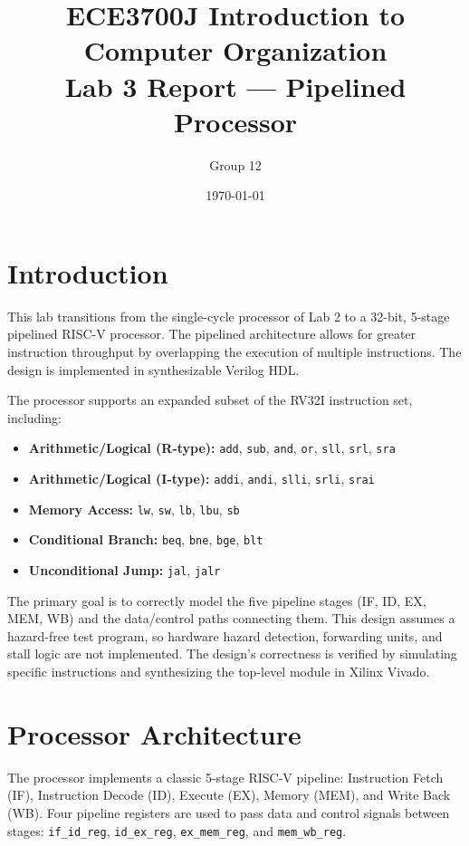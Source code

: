 \documentclass{article}
\title{\textbf{ECE3700J Introduction to Computer Organization \\
Lab 3 Report --- Pipelined Processor}}
\author{\large Group 12 \\ %
}
\date{\today} %
\begin{document}
\maketitle

\newpage
\tableofcontents

\newpage
\section{Introduction}

This lab transitions from the single-cycle processor of Lab 2 to a 32-bit, 5-stage pipelined RISC-V processor. The pipelined architecture allows for greater instruction throughput by overlapping the execution of multiple instructions. The design is implemented in synthesizable Verilog HDL.

The processor supports an expanded subset of the RV32I instruction set, including:
\begin{itemize}
    \item \textbf{Arithmetic/Logical (R-type):} \texttt{add}, \texttt{sub}, \texttt{and}, \texttt{or}, \texttt{sll}, \texttt{srl}, \texttt{sra}
    \item \textbf{Arithmetic/Logical (I-type):} \texttt{addi}, \texttt{andi}, \texttt{slli}, \texttt{srli}, \texttt{srai}
    \item \textbf{Memory Access:} \texttt{lw}, \texttt{sw}, \texttt{lb}, \texttt{lbu}, \texttt{sb}
    \item \textbf{Conditional Branch:} \texttt{beq}, \texttt{bne}, \texttt{bge}, \texttt{blt}
    \item \textbf{Unconditional Jump:} \texttt{jal}, \texttt{jalr}
\end{itemize}

The primary goal is to correctly model the five pipeline stages (IF, ID, EX, MEM, WB) and the data/control paths connecting them. This design assumes a hazard-free test program, so hardware hazard detection, forwarding units, and stall logic are not implemented. The design's correctness is verified by simulating specific instructions and synthesizing the top-level module in Xilinx Vivado.

\section{Processor Architecture}

The processor implements a classic 5-stage RISC-V pipeline: Instruction Fetch (IF), Instruction Decode (ID), Execute (EX), Memory (MEM), and Write Back (WB). Four pipeline registers are used to pass data and control signals between stages: \texttt{if\_id\_reg}, \texttt{id\_ex\_reg}, \texttt{ex\_mem\_reg}, and \texttt{mem\_wb\_reg}.
\end{document}
